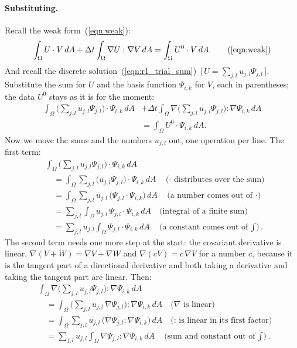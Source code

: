 \paragraph{Substituting.} Recall the weak form~(\ref{eqn:weak}):
\begin{equation*}
\int_\Omega U \cdot V\, dA + \Delta t \int_\Omega \nabla U : \nabla V\, dA = \int_\Omega U^0 \cdot V\, dA . \tag{\ref{eqn:weak}}
\end{equation*}
And recall the discrete solution~(\ref{eqn:r1_trial_sum})~[\,$U = \sum_{j,l} u_{j,l}\Psi_{j,l}$\,]. Substitute the sum for $U$ and the basis function $\Psi_{i,k}$ for $V$, each in parentheses; the data $U^0$ stays as it is for the moment:
\begin{equation*}
\begin{split}
\int_\Omega \Big(\sum_{j,l} u_{j,l}\Psi_{j,l}\Big) \cdot \Psi_{i,k}\, dA &+ \Delta t \int_\Omega \nabla\Big(\sum_{j,l} u_{j,l}\Psi_{j,l}\Big) : \nabla \Psi_{i,k}\, dA \\
&= \int_\Omega U^0 \cdot \Psi_{i,k}\, dA .
\end{split}
\end{equation*}
Now we move the sums and the numbers $u_{j,l}$ out, one operation per line. The first term:
\begin{align*}
&\int_\Omega \Big(\sum_{j,l} u_{j,l}\Psi_{j,l}\Big) \cdot \Psi_{i,k}\, dA \\
&\quad= \int_\Omega \sum_{j,l} \big(u_{j,l}\Psi_{j,l}\big) \cdot \Psi_{i,k}\, dA \quad \text{($\cdot$ distributes over the sum)}\\
&\quad= \int_\Omega \sum_{j,l} u_{j,l}\, \big(\Psi_{j,l} \cdot \Psi_{i,k}\big)\, dA \quad \text{(a number comes out of $\cdot$)}\\
&\quad= \sum_{j,l} \int_\Omega u_{j,l}\, \Psi_{j,l} \cdot \Psi_{i,k}\, dA \quad \text{(integral of a finite sum)}\\
&\quad= \sum_{j,l} u_{j,l} \int_\Omega \Psi_{j,l} \cdot \Psi_{i,k}\, dA \quad \text{(a constant comes out of $\textstyle\int$)} .
\end{align*}
The second term needs one more step at the start: the covariant derivative is linear, $\nabla(V + W) = \nabla V + \nabla W$ and $\nabla(cV) = c\,\nabla V$ for a number $c$, because it is the tangent part of a directional derivative and both taking a derivative and taking the tangent part are linear. Then:
\begin{align*}
&\int_\Omega \nabla\Big(\sum_{j,l} u_{j,l}\Psi_{j,l}\Big) : \nabla \Psi_{i,k}\, dA \\
&\quad= \int_\Omega \Big(\sum_{j,l} u_{j,l}\,\nabla\Psi_{j,l}\Big) : \nabla \Psi_{i,k}\, dA \quad \text{($\nabla$ is linear)}\\
&\quad= \int_\Omega \sum_{j,l} u_{j,l}\, \big(\nabla\Psi_{j,l} : \nabla \Psi_{i,k}\big)\, dA \quad \text{($:$ is linear in its first factor)}\\
&\quad= \sum_{j,l} u_{j,l} \int_\Omega \nabla\Psi_{j,l} : \nabla \Psi_{i,k}\, dA \quad \text{(sum and constant out of $\textstyle\int$)} .
\end{align*}
